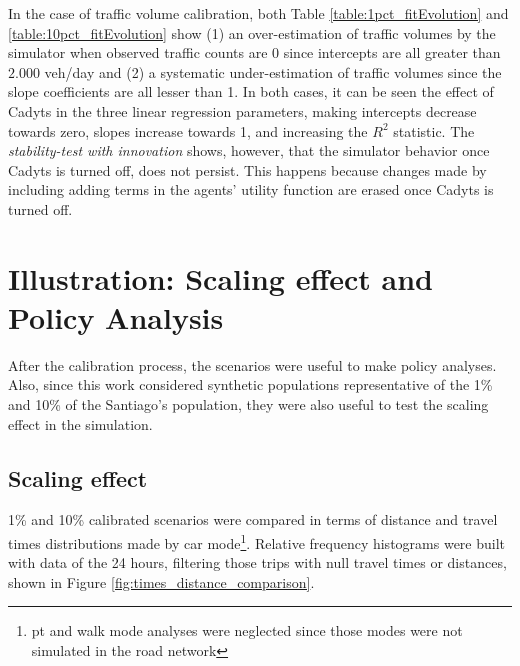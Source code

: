 \documentclass[Journal,letterpaper]{ascelike-new}
\begin{document}
In the case of traffic volume calibration, both Table \ref{table:1pct_fitEvolution} and \ref{table:10pct_fitEvolution} show (1) an over-estimation of traffic volumes by the simulator when observed traffic counts are 0 since intercepts are all greater than $2.000$ veh/day and (2) a systematic under-estimation of traffic volumes since the slope coefficients are all lesser than 1. In both cases, it can be seen the effect of Cadyts in the three linear regression parameters, making intercepts decrease towards zero, slopes increase towards 1, and increasing the $R^2$ statistic. The \emph{stability-test with innovation} shows, however, that the simulator behavior once Cadyts is turned off, does not persist. This happens because changes made by including adding terms in the agents' utility function are erased once Cadyts is turned off.
\section{Illustration: Scaling effect and Policy Analysis}
After the calibration process, the scenarios were useful to make policy analyses. Also, since this work considered synthetic populations representative of the 1\% and 10\% of the Santiago's population, they were also useful to test the scaling effect in the simulation.
\subsection{Scaling effect}
\label{sect:scaling_effect}
1\% and 10\% calibrated scenarios were compared in terms of distance and travel times distributions made by car mode\footnote{pt and walk mode analyses were neglected since those modes were not simulated in the road network}. Relative frequency histograms were built with data of the 24 hours, filtering those trips with null travel times or distances, shown in Figure \ref{fig:times_distance_comparison}. 
\end{document}
